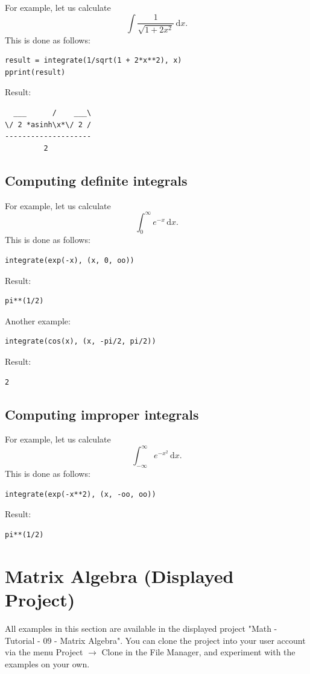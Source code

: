 \documentclass[article,A4,12pt]{llncs}
\def\x{\mathbf{x}}
\begin{document}
For example, let us calculate 
$$
\int \frac{1}{\sqrt{1 + 2x^2}}\, \mbox{d} x.
$$
This is done as follows:
\begin{verbatim}
result = integrate(1/sqrt(1 + 2*x**2), x)
pprint(result)
\end{verbatim}
Result:
\begin{verbatim}
  ___      /    ___\
\/ 2 *asinh\x*\/ 2 /
--------------------
         2      
\end{verbatim}

\subsection{Computing definite integrals}

For example, let us calculate
$$
\int_0^{\infty} e^{-x}\, \mbox{d} x.
$$
This is done as follows:
\begin{verbatim}
integrate(exp(-x), (x, 0, oo))
\end{verbatim}
Result:
\begin{verbatim}
pi**(1/2)
\end{verbatim}
Another example:
\begin{verbatim}
integrate(cos(x), (x, -pi/2, pi/2))
\end{verbatim}
Result:
\begin{verbatim}
2
\end{verbatim}

\subsection{Computing improper integrals}

For example, let us calculate
$$
\int_{-\infty}^{\infty} e^{-x^2}\, \mbox{d} x.
$$
This is done as follows:
\begin{verbatim}
integrate(exp(-x**2), (x, -oo, oo))
\end{verbatim}
Result:
\begin{verbatim}
pi**(1/2)
\end{verbatim}


\section{Matrix Algebra (Displayed Project)}

All examples in this section are available in the displayed project 
"Math - Tutorial - 09 - Matrix Algebra". You can clone the project into 
your user account via the menu Project $\rightarrow$ Clone in the File 
Manager, and experiment with the examples on your own.
\end{document}
